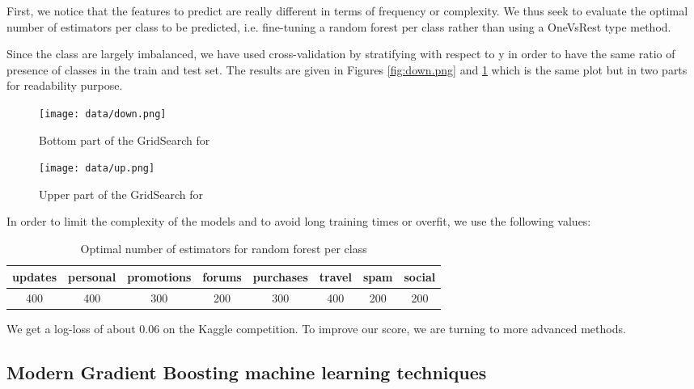 \documentclass{article}
\begin{document}
First, we notice that the features to predict are really different in terms of frequency or complexity. We thus seek to evaluate the optimal number of estimators per class to be predicted, i.e. fine-tuning a random forest per class rather than using a OneVsRest type method.

Since the class are largely imbalanced, we have used cross-validation by stratifying with respect to y in order to have the same ratio of presence of classes in the train and test set. The results are given in Figures \ref{fig:down.png} and \ref{fig:up.png} which is the same plot but in two parts for readability purpose.

\begin{figure}[!tbp]
  \centering
  \begin{minipage}[bh!]{0.4\textwidth}
    \texttt{[image: data/down.png]}
    \caption{Bottom part of the GridSearch for }
    \label{fig:down.png}
  \end{minipage}
  \hfill
  \begin{minipage}[bh!]{0.4\textwidth}
    \texttt{[image: data/up.png]}
    \caption{Upper part of the GridSearch for }
    \label{fig:up.png}
  \end{minipage}
\end{figure}

In order to limit the complexity of the models and to avoid long training times or overfit, we use the following values:

\begin{table}[h!]
\begin{center}
 \begin{tabular}{|c | c | c | c | c | c | c | c|} 
 \hline
  updates & personal & promotions & forums & purchases & travel & spam & social\\ [0.5ex] 
  \hline
  400 & 400 & 300 & 200 & 300 & 400 & 200 & 200\\
  \hline
\end{tabular}
\end{center}
\caption{Optimal number of estimators for random forest per class}
\end{table}

We get a log-loss of about 0.06 on the Kaggle competition. To improve our score, we are turning to more advanced methods.

\subsection{Modern Gradient Boosting machine learning techniques}
\end{document}
